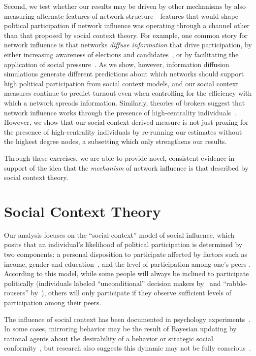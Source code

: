 \documentclass[12pt]{article}
\begin{document}
Second, we test whether our results may be driven by other mechanisms by also measuring alternate features of network structure---features that would shape political participation if network influence was operating through a channel other than that proposed by social context theory. For example, one common story for network influence is that networks \emph{diffuse information} that drive participation, by either increasing awareness of elections and candidates~\citep{mcclurg2003social}, or by facilitating the application of social pressure~\citep{EubankKronick, larson2017west}. As we show, however, information diffusion simulations generate different predictions about which networks should support high political participation from social context models, and our social context measures continue to predict turnout even when controlling for the efficiency with which a network spreads information. Similarly, theories of brokers suggest that network influence works through the presence of high-centrality individuals~\citep{Rojo:2014vw}. However, we show that our social-context-derived measure is not just proxing for the presence of high-centrality individuals by re-running our estimates without the highest degree nodes, a subsetting which only strengthens our results.

Through these exercises, we are able to provide novel, consistent evidence in support of the idea that the \emph{mechanism} of network influence is that described by social context theory.

\section{Social Context Theory}


Our analysis focuses on the ``social context'' model of social influence, which posits that an individual's likelihood of political participation is determined by two components: a personal disposition to participate affected by factors such as income, gender and education~\citep{wolfinger1980votes}, and the level of participation among one's peers \citep{Fowler:2005ts,Siegel:2009vi,Rolfe:2012ka}. According to this model, while some people will always be inclined to participate politically (individuals labeled ``unconditional'' decision makers by~\citet{Rolfe:2012ka} and ``rabble-rousers'' by~\citet{Siegel:2009vi}), others will only participate if they observe sufficient levels of participation among their peers.

The influence of social context has been documented in psychology experiments~\citep{ross2011person}.  In some cases, mirroring behavior may be the result of Bayesian updating by rational agents about the desirability of a behavior or strategic social conformity~\citep{goyal2012connections}, but research also suggests this dynamic may not be fully conscious~\citep{Cialdini:2015gt}.
\end{document}
